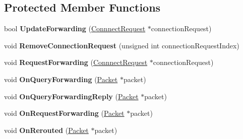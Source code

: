 \subsection*{Protected Member Functions}
\begin{DoxyCompactItemize}
\item 
\hypertarget{class_rak_net_1_1_router2_acc98e75c4dc3f84d9ebd2d853b7fb151}{bool {\bfseries Update\-Forwarding} (\hyperlink{struct_rak_net_1_1_router2_1_1_connnect_request}{Connnect\-Request} $\ast$connection\-Request)}\label{class_rak_net_1_1_router2_acc98e75c4dc3f84d9ebd2d853b7fb151}

\item 
\hypertarget{class_rak_net_1_1_router2_afa4f7227b9bea786e4e9b0068ae0cef0}{void {\bfseries Remove\-Connection\-Request} (unsigned int connection\-Request\-Index)}\label{class_rak_net_1_1_router2_afa4f7227b9bea786e4e9b0068ae0cef0}

\item 
\hypertarget{class_rak_net_1_1_router2_a76d811588d6c8efba886231adf78ed09}{void {\bfseries Request\-Forwarding} (\hyperlink{struct_rak_net_1_1_router2_1_1_connnect_request}{Connnect\-Request} $\ast$connection\-Request)}\label{class_rak_net_1_1_router2_a76d811588d6c8efba886231adf78ed09}

\item 
\hypertarget{class_rak_net_1_1_router2_a9879ac26bf3cb0890558124d3c99ca5c}{void {\bfseries On\-Query\-Forwarding} (\hyperlink{struct_rak_net_1_1_packet}{Packet} $\ast$packet)}\label{class_rak_net_1_1_router2_a9879ac26bf3cb0890558124d3c99ca5c}

\item 
\hypertarget{class_rak_net_1_1_router2_a34fdba6917b7a673e77d547020591c06}{void {\bfseries On\-Query\-Forwarding\-Reply} (\hyperlink{struct_rak_net_1_1_packet}{Packet} $\ast$packet)}\label{class_rak_net_1_1_router2_a34fdba6917b7a673e77d547020591c06}

\item 
\hypertarget{class_rak_net_1_1_router2_a8729ea8016a2f46d79f01fdecdf90d13}{void {\bfseries On\-Request\-Forwarding} (\hyperlink{struct_rak_net_1_1_packet}{Packet} $\ast$packet)}\label{class_rak_net_1_1_router2_a8729ea8016a2f46d79f01fdecdf90d13}

\item 
\hypertarget{class_rak_net_1_1_router2_adb4c4457892d96a77b2b4a5126a11fca}{void {\bfseries On\-Rerouted} (\hyperlink{struct_rak_net_1_1_packet}{Packet} $\ast$packet)}\label{class_rak_net_1_1_router2_adb4c4457892d96a77b2b4a5126a11fca}


\end{DoxyCompactItemize}
